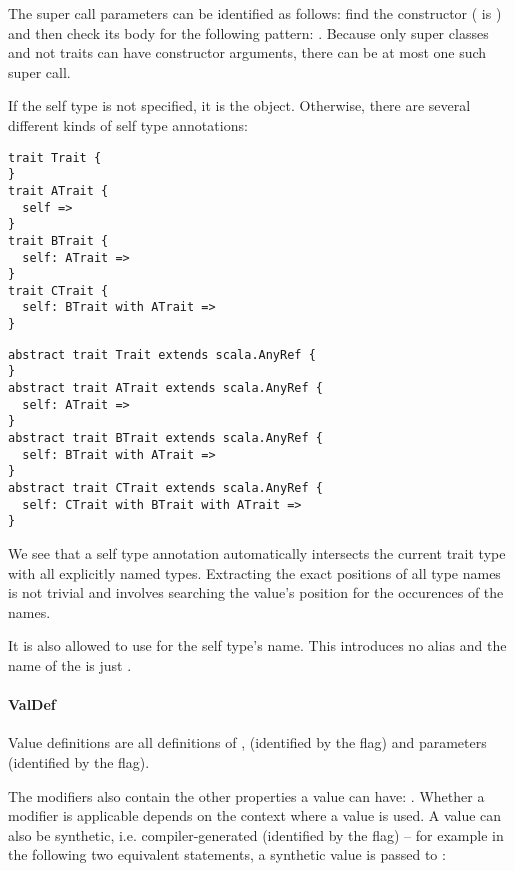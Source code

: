 The super call parameters can be identified as follows: find the constructor  ( is ) and then check its body  for the following pattern: . Because only super classes and not traits can have constructor arguments, there can be at most one such super call.

If the self type is not specified, it is the  object. Otherwise, there are several different kinds of self type annotations:

\begin{multicols}{2}
\begin{lstlisting}
trait Trait {
}
trait ATrait {
  self =>
}
trait BTrait {
  self: ATrait =>
}
trait CTrait {
  self: BTrait with ATrait =>
}
\end{lstlisting}
\begin{lstlisting}
abstract trait Trait extends scala.AnyRef {
}
abstract trait ATrait extends scala.AnyRef { 
  self: ATrait => 
}
abstract trait BTrait extends scala.AnyRef {
  self: BTrait with ATrait =>
}
abstract trait CTrait extends scala.AnyRef {
  self: CTrait with BTrait with ATrait =>
}
\end{lstlisting}
\end{multicols}

We see that a self type annotation automatically intersects the current trait type with all explicitly named types. Extracting the exact positions of all type names is not trivial and involves searching the value's position for the occurences of the names.

It is also allowed to use  for the self type's name. This introduces no alias and the name of the  is just \src{\_}.

\paragraph{ValDef} 

\noindent Value definitions are all definitions of ,  (identified by the  flag) and parameters (identified by the  flag).

The modifiers also contain the other properties a value can have: . Whether a modifier is applicable depends on the context where a value is used. A value can also be synthetic, i.e. compiler-generated (identified by the  flag) -- for example in the following two equivalent statements, a synthetic value is passed to :

